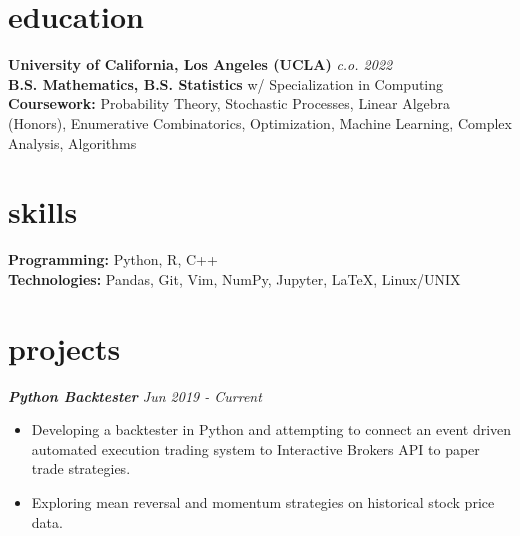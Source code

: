 \documentclass[margin, 12pt]{res} %
\begin{document}
\begin{resume}


\section{\large education}

{\bf University of California, Los Angeles (UCLA)} \hfill{\sl c.o. 2022}\\
{\sl}{\bf  B.S. Mathematics, B.S. Statistics}{ w/ Specialization in Computing}\\
{\bf Coursework:} Probability Theory, Stochastic Processes, Linear Algebra (Honors), Enumerative Combinatorics, Optimization, Machine Learning, Complex Analysis, Algorithms


\section{\large skills} 

{\bf Programming:} 
Python, R, C++\\ 
{\bf Technologies:}
Pandas, Git, Vim, NumPy,  Jupyter, {\LaTeX}, Linux/UNIX
 
\section{\large projects} 


{\sl {\bf Python Backtester} \hfill Jun 2019 - Current} 
\begin{itemize}  \itemsep -1pt
\item Developing a backtester in Python and attempting to connect an event driven automated execution trading system to Interactive Brokers API to paper trade strategies.
\item Exploring mean reversal and momentum strategies on historical stock price data.
\end{itemize} 


\end{resume}
\end{document}
